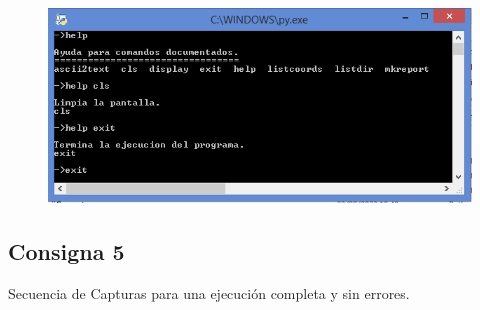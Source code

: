 \documentclass[a4paper,12pt]{article}
\begin{document}
\begin{figure}[htbp]
    \begin{adjustbox}{max width=\textwidth, center}
        \includegraphics{C4/S7_C4.PNG}
    \end{adjustbox}
\end{figure}

\newpage
\subsection{Consigna 5}
Secuencia de Capturas para una ejecución completa y sin errores.
\end{document}
